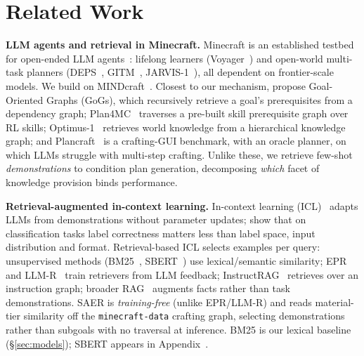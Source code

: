 \documentclass[letterpaper]{article} %
\newcommand{\secref}[1]{\S\ref{#1}}
\newcommand{\appref}[1]{Appendix~\getrefnumber{#1}}
\begin{document}
\section{Related Work}

\noindent\textbf{LLM agents and retrieval in Minecraft.}
Minecraft is an established testbed for open-ended LLM
agents~\citep{fan2022minedojo}: lifelong learners
(Voyager~\citep{wang2023voyager}) and open-world multi-task planners
(DEPS~\citep{wang2023describe}, GITM~\citep{zhu2023ghost},
JARVIS-1~\citep{wang2023jarvis}), all dependent on frontier-scale
models.  We build on MINDcraft~\citep{nottingham2023mindcraft}.  Closest
to our mechanism, \citet{leung2025knowledge} propose Goal-Oriented
Graphs (GoGs), which recursively retrieve a goal's prerequisites from a
dependency graph;
Plan4MC~\citep{yuan2023plan4mc} traverses a pre-built skill prerequisite
graph over RL skills; Optimus-1~\citep{li2024optimus} retrieves world
knowledge from a hierarchical knowledge graph; and
Plancraft~\citep{dagan2024plancraft} is a crafting-GUI benchmark, with an
oracle planner, on which LLMs struggle with multi-step crafting.  Unlike these, we retrieve few-shot
\emph{demonstrations} to condition plan generation, decomposing
\emph{which} facet of knowledge provision binds performance.

\noindent\textbf{Retrieval-augmented in-context learning.}
\label{sec:ricl}
In-context learning (ICL)~\citep{brown2020language} adapts LLMs from
demonstrations without parameter updates; \citet{min2022rethinking} show
that on classification tasks label correctness matters less than label
space, input distribution and format.  Retrieval-based ICL selects examples per query:
unsupervised methods (BM25~\citep{robertson2009probabilistic},
SBERT~\citep{reimers2019sentence}) use lexical/semantic similarity;
EPR~\citep{rubin2022learning} and LLM-R~\citep{wang2024learning} train
retrievers from LLM feedback; InstructRAG~\citep{wang2025instructrag}
retrieves over an instruction graph; broader
RAG~\citep{lewis2020retrieval,gao2023retrieval} augments facts rather than
task demonstrations.  SAER is \emph{training-free} (unlike EPR/LLM-R) and
reads material-tier similarity off the \texttt{minecraft-data} crafting
graph, selecting demonstrations rather than subgoals with no traversal at
inference.  BM25 is our lexical baseline
(\secref{sec:models}); SBERT appears in \appref{app:threeway}.
\end{document}
